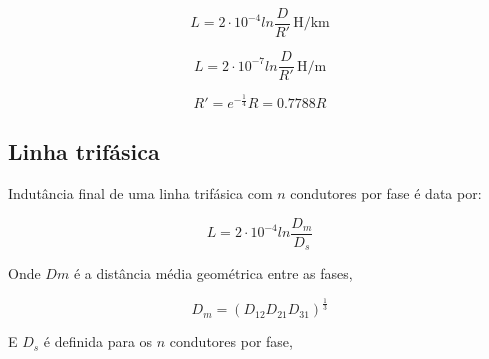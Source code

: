 \documentclass[a4paper, 10pt, twocolumn]{article}
\newcommand{\unit}[1]{\ensuremath{\, \mathrm{#1}}}
\begin{document}
    $$
        L = 2 \cdot 10^{-4} ln\frac{D}{R'} \unit{H/km}
    $$
    
    $$
        L = 2 \cdot 10^{-7} ln\frac{D}{R'} \unit{H/m}
    $$

    $$
        R' = e^{-\frac{1}{4}}R = 0.7788R
    $$

\subsection{Linha trifásica}
Indutância final de uma linha trifásica com $n$ condutores por fase é data por:

$$
    L = 2 \cdot 10^{-4} ln\frac{D_m}{D_s}
$$

Onde $Dm$ é a distância média geométrica entre as fases,

$$
D_m = (D_{12} D_{21} D_{31})^{\frac{1}{3}}
$$

E $D_s$ é definida para os $n$ condutores por fase,
\end{document}
